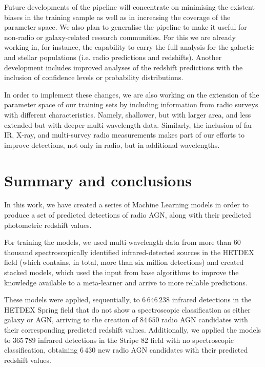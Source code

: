 \documentclass{aa}
\begin{document}
Future developments of the pipeline will concentrate on minimising the existent biases in the training sample as well as in increasing the coverage of the parameter space. We also plan to generalise the pipeline to make it useful for non-radio or galaxy-related research communities. For this we are already working in, for instance, the capability to carry the full analysis for the galactic and stellar populations (i.e. radio predictions and redshifts). Another development includes improved analyses of the redshift predictions with the inclusion of confidence levels or probability distributions.

In order to implement these changes, we are also working on the extension of the parameter space of our training sets by including information from radio surveys with different characteristics. Namely, shallower, but with larger area, and less extended but with deeper multi-wavelength data. Similarly, the inclusion of far-IR, X-ray, and multi-survey radio measurements makes part of our efforts to improve detections, not only in radio, but in additional wavelengths.
 
\section{Summary and conclusions}\label{sec:summary_conclusions}

In this work, we have created a series of Machine Learning models in order to produce a set of predicted detections of radio AGN, along with their predicted photometric redshift values.

For training the models, we used multi-wavelength data from more than $60$ thousand spectroscopically identified infrared-detected sources in the HETDEX field (which contains, in total, more than six million detections) and created stacked models, which used the input from base algorithms to improve the knowledge available to a meta-learner and arrive to more reliable predictions.

These models were applied, sequentially, to $6\,646\,238$ infrared detections in the HETDEX Spring field that do not show a spectroscopic classification as either galaxy or AGN, arriving to the creation of $84\,650$ radio AGN candidates with their corresponding predicted redshift values. Additionally, we applied the models to $365\,789$ infrared detections in the Stripe 82 field with no spectroscopic classification, obtaining $6\,430$ new radio AGN candidates with their predicted redshift values.
\end{document}
